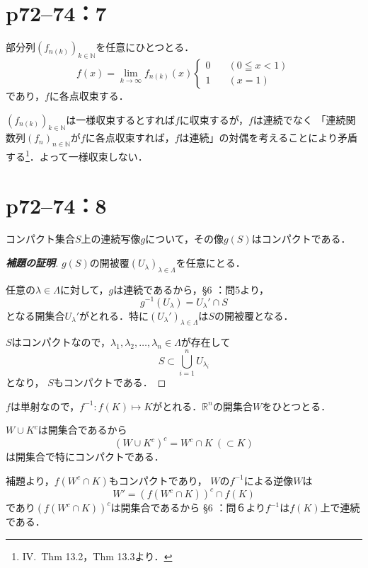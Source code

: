\section*{p72--74：7}

\begin{tproof}
    部分列$(f_{n(k)})_{k \in \mathbb{N}}$を任意にひとつとる．
    \[
        f(x)= \lim_{k \to \infty} f_{n(k)}(x)
        \begin{cases}
            0 \quad  & ( 0 \leqq x < 1) \\
            1  \quad & ( x=1)
        \end{cases}
    \]
    であり，$f$に各点収束する．

    $(f_{n(k)})_{k \in \mathbb{N}}$は一様収束するとすれば$f$に収束するが，$f$は連続でなく
    「連続関数列$(f_n)_{n \in \mathbb{N}}$が$f$に各点収束すれば，$f$は連続」の対偶を考えることにより矛盾する\footnote{IV.~Thm 13.2，Thm 13.3より．}．よって一様収束しない．
\end{tproof}

\newpage


\section*{p72--74：8}

\begin{lemma}{}{}
    コンパクト集合$S$上の連続写像$g$について，その像$g(S)$はコンパクトである．
\end{lemma}

\begin{proof}[\textup{\textbf{補題の証明}}]
    $g(S)$の開被覆$(U_{\lambda})_{\lambda \in \Lambda}$を任意にとる．

    任意の$\lambda \in \Lambda$に対して，$g$は連続であるから，\S 6 ：問5より，
    \[
        g^{-1}(U_{\lambda}) =  U_{\lambda}'  \cap S
    \]
    となる開集合$U_{\lambda}'$がとれる．特に$(U_{\lambda}')_{\lambda \in \Lambda}$は$S$の開被覆となる．

    $S$はコンパクトなので，$\lambda_1, \lambda_2, \ldots , \lambda_n \in \Lambda$が存在して
    \[
        S \subset \bigcup_{i=1}^{n} U_{\lambda_i}
    \]
    となり， $S$もコンパクトである．
\end{proof}


\begin{tproof}
    $f$は単射なので，$f^{-1} \colon f(K) \mapsto K$がとれる．$\mathbb{R}^n$の開集合$W$をひとつとる．

    $W \cup K^c$は開集合であるから
    \[
        (W \cup K^c)^c = W^c \cap K~(\subset K)
    \]
    は開集合で特にコンパクトである．

    補題より，$f(W^c \cap K)$もコンパクトであり，
    $W$の$f^{-1}$による逆像$W$は
    \[
        W' = (f(W^c \cap K))^c \cap f(K)
    \]
    であり$(f(W^c \cap K))^c$は開集合であるから
    \S 6 ：問６より$f^{-1}$は$f(K)$上で連続である．
\end{tproof}

